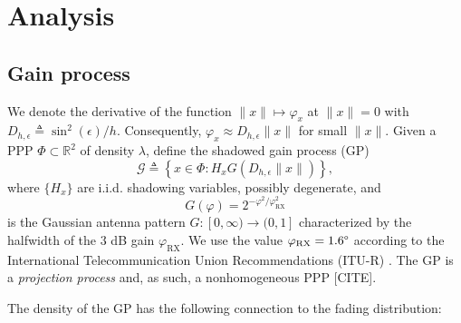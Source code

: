 \documentclass[conference]{IEEEtran}
\newcommand{\R}{\mathbb{R}}
\theoremstyle{definition}
\theoremstyle{plain}
\begin{document}
         
         \section{Analysis}
         
         \subsection{Gain process}
         We denote the derivative of the function $\|x\| \mapsto \varphi_x $ at $\|x\| =0$ with $D_{h,\epsilon} \triangleq \sin^2(\epsilon)/h$. Consequently, $\varphi_x \approx D_{h,\epsilon}\|x\|$ for small $\|x\|$.
         Given a PPP $\Phi \subset \R^2$ of density $\lambda$, define the shadowed gain process (GP)
         \begin{equation}
           \label{eq:gainprocess}
           \mathcal{G} \triangleq \left\{x \in \Phi : H_x G(D_{h,\epsilon}\|x\|) \right\},
          \end{equation}
          where $\{H_x\}$ are i.i.d. shadowing variables, possibly degenerate, and 
          \begin{equation}
            G(\varphi) = 2^{-\varphi^2/\varphi^2_{\text{RX}}}
          \end{equation}
          is the Gaussian antenna pattern $G:[0,\infty) \rightarrow (0,1]$ characterized by the halfwidth of the $3$ dB gain $\varphi_{\text{RX}}$. We use the value $\varphi_{\text{RX}} = 1.6 \degree$ according to the International Telecommunication Union Recommendations (ITU-R) \cite{ITURS1528}. The GP is a \textit{projection process} and, as such, a nonhomogeneous PPP [CITE].

          The density of the GP has the following connection to the fading distribution:
\end{document}
